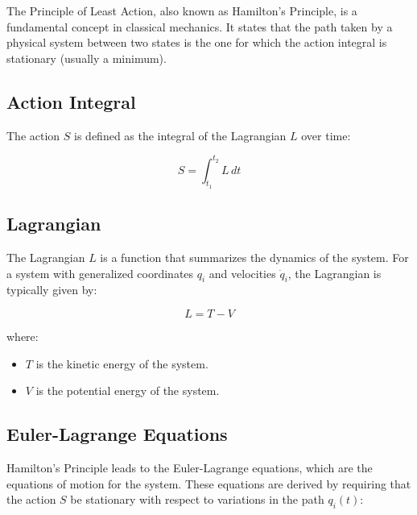 \documentclass[
  a4paper,
]{book}
\begin{document}
\begin{tcolorbox}[enhanced jigsaw, coltitle=black, title=\textcolor{quarto-callout-tip-color}{\faLightbulb}\hspace{0.5em}{Principle of Least Action (Hamilton's Principle)}, colframe=quarto-callout-tip-color-frame, toprule=.15mm, opacitybacktitle=0.6, left=2mm, opacityback=0, breakable, toptitle=1mm, bottomtitle=1mm, leftrule=.75mm, arc=.35mm, titlerule=0mm, colbacktitle=quarto-callout-tip-color!10!white, rightrule=.15mm, bottomrule=.15mm, colback=white]

The Principle of Least Action, also known as Hamilton's Principle, is a
fundamental concept in classical mechanics. It states that the path
taken by a physical system between two states is the one for which the
action integral is stationary (usually a minimum).

\subsection{Action Integral}\label{action-integral}

The action \(S\) is defined as the integral of the Lagrangian \(L\) over
time:

\[
S = \int_{t_1}^{t_2} L \, dt
\]

\subsection{Lagrangian}\label{lagrangian}

The Lagrangian \(L\) is a function that summarizes the dynamics of the
system. For a system with generalized coordinates \(q_i\) and velocities
\(\dot{q}_i\), the Lagrangian is typically given by:

\[
L = T - V
\]

where:

\begin{itemize}
\item
  \(T\) is the kinetic energy of the system.
\item
  \(V\) is the potential energy of the system.
\end{itemize}

\subsection{Euler-Lagrange Equations}\label{euler-lagrange-equations}

Hamilton's Principle leads to the Euler-Lagrange equations, which are
the equations of motion for the system. These equations are derived by
requiring that the action \(S\) be stationary with respect to variations
in the path \(q_i(t)\):


\end{tcolorbox}
\end{document}
